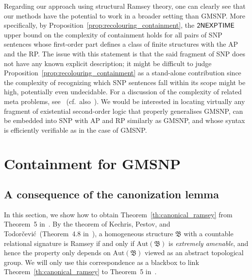 \documentclass[oneside,reqno,12pt]{amsart}
\theoremstyle{plain}
\theoremstyle{remark}
\newcommand{\struct}[1]{\mathfrak{#1}}
\newcommand{\Aut}{\ensuremath{\mathrm{Aut}}\xspace}
\newcommand{\TWONEXPTIME}{{\textup{\textsf{2NEXPTIME}}}\xspace}
\begin{document}
{Regarding our approach using structural Ramsey theory, one can clearly see that our methods have the potential to work in a broader setting than GMSNP.
More specifically, by Proposition~\ref{prop:recolouring_containment}, the $\TWONEXPTIME$ upper bound on the complexity of containment holds for all pairs of SNP sentences whose first-order part defines a class of finite structures with the AP and the RP.
The issue with this statement is that the said fragment of SNP does not have any known explicit description;
it might be difficult to judge Proposition~\ref{prop:recolouring_containment} as a stand-alone contribution 
since the complexity of recognizing which SNP sentences fall within its scope might be high, potentially even undecidable.
For a discussion of the complexity of related meta problems, see~\cite{rydval:LIPIcs.ICALP.2024.150} (cf.~also~\cite{rydval_arxiv}).
We would be interested in locating virtually any fragment of existential second-order logic that properly generalises GMSNP, can be embedded into SNP with AP and RP similarly as GMSNP, and whose syntax is efficiently verifiable as in the case of GMSNP.  

    
 
   
 










\newpage 
\appendix 

 

\section{Containment for GMSNP}
 
\subsection{A consequence of the canonization lemma}\label{apsection:ramsey_canonical}

In this section, we show how to obtain Theorem~\ref{th:canonical_ramsey} from Theorem~5 in~\cite{bodirsky_pinsker_ramsey_canonical}.
By the theorem of Kechris, Pestov, and Todor{\v c}evi{\'c}~(Theorem~4.8 in~\cite{kechris2005fraisse}), a homogeneous structure $\struct{B}$ with a countable relational signature is Ramsey if and only if $\Aut(\struct{B})$ is \emph{extremely amenable}, and hence the property only depends on $\Aut(\struct{B})$ viewed as an abstract topological group.  
We will only use this correspondence as a blackbox to link Theorem~\ref{th:canonical_ramsey} to Theorem~5 in~\cite{bodirsky_pinsker_ramsey_canonical}. 

}
\end{document}
